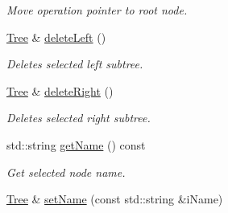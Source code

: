 \begin{DoxyCompactItemize}
\begin{DoxyCompactList}\small\item\em Move operation pointer to root node. \end{DoxyCompactList}\item 
\hypertarget{classtree_1_1Tree_a1a3832a39a4b353766baf84316c692dc}{\hyperlink{classtree_1_1Tree}{Tree} \& \hyperlink{classtree_1_1Tree_a1a3832a39a4b353766baf84316c692dc}{delete\-Left} ()}\label{classtree_1_1Tree_a1a3832a39a4b353766baf84316c692dc}

\begin{DoxyCompactList}\small\item\em Deletes selected left subtree. \end{DoxyCompactList}\item 
\hypertarget{classtree_1_1Tree_af4ddc57ec2ed9629cd48dd34a2ab0645}{\hyperlink{classtree_1_1Tree}{Tree} \& \hyperlink{classtree_1_1Tree_af4ddc57ec2ed9629cd48dd34a2ab0645}{delete\-Right} ()}\label{classtree_1_1Tree_af4ddc57ec2ed9629cd48dd34a2ab0645}

\begin{DoxyCompactList}\small\item\em Deletes selected right subtree. \end{DoxyCompactList}\item 
\hypertarget{classtree_1_1Tree_afc485303d43f5ac66b074a9fc5d7d212}{std\-::string \hyperlink{classtree_1_1Tree_afc485303d43f5ac66b074a9fc5d7d212}{get\-Name} () const }\label{classtree_1_1Tree_afc485303d43f5ac66b074a9fc5d7d212}

\begin{DoxyCompactList}\small\item\em Get selected node name. \end{DoxyCompactList}\item 
\hypertarget{classtree_1_1Tree_aadbae7ca0bd170156b91d9f13d0fa783}{\hyperlink{classtree_1_1Tree}{Tree} \& \hyperlink{classtree_1_1Tree_aadbae7ca0bd170156b91d9f13d0fa783}{set\-Name} (const std\-::string \&i\-Name)}\label{classtree_1_1Tree_aadbae7ca0bd170156b91d9f13d0fa783}


\end{DoxyCompactItemize}

